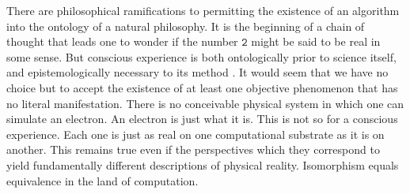 \documentclass[runningheads]{llncs}
\begin{document}
There are philosophical ramifications to permitting the existence of an algorithm into the ontology of a natural philosophy. It is the beginning of a chain of thought that leads one to wonder if the number $\texttt{2}$ might be said to be real in some sense. But conscious experience is both ontologically prior to science itself, and epistemologically necessary to its method \cite{Chalmers1996} \cite{KantSynthetic}. It would seem that we have no choice but to accept the existence of at least one objective phenomenon that has no literal manifestation. There is no conceivable physical system in which one can simulate an electron. An electron is just what it is. This is not so for a conscious experience. Each one is just as real on one computational substrate as it is on another. This remains true even if the perspectives which they correspond to yield fundamentally different descriptions of physical reality. Isomorphism equals equivalence in the land of computation.

% 
% 
% 
\end{document}
